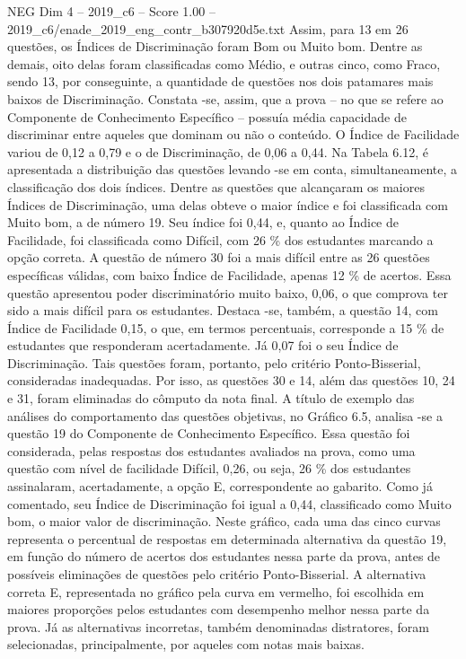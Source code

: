 \begin{textsample}{NEG Dim 4 – 2019\_c6 – Score 1.00 – 2019\_c6/enade\_2019\_eng\_contr\_b307920d5e.txt}
Assim, para 13 em 26 questões, os Índices de Discriminação foram Bom ou Muito bom.
Dentre as demais, oito delas foram classificadas como Médio, e outras cinco, como Fraco, sendo 13, por conseguinte, a quantidade de questões nos dois patamares mais baixos de Discriminação.
Constata -se, assim, que a prova – no que se refere ao Componente de Conhecimento Específico – possuía média capacidade de discriminar entre aqueles que dominam ou não o conteúdo.
O Índice de Facilidade variou de 0,12 a 0,79 e o de Discriminação, de 0,06 a 0,44.
Na Tabela 6.12, é apresentada a distribuição das questões levando -se em conta, simultaneamente, a classificação dos dois índices.
Dentre as questões que alcançaram os maiores Índices de Discriminação, uma delas obteve o maior índice e foi classificada com Muito bom, a de número 19.
Seu índice foi 0,44, e, quanto ao Índice de Facilidade, foi classificada como Difícil, com 26 \% dos estudantes marcando a opção correta.
A questão de número 30 foi a mais difícil entre as 26 questões específicas válidas, com baixo Índice de Facilidade, apenas 12 \% de acertos.
Essa questão apresentou poder discriminatório muito baixo, 0,06, o que comprova ter sido a mais difícil para os estudantes.
Destaca -se, também, a questão 14, com Índice de Facilidade 0,15, o que, em termos percentuais, corresponde a 15 \% de estudantes que responderam acertadamente.
Já 0,07 foi o seu Índice de Discriminação.
Tais questões foram, portanto, pelo critério Ponto-Bisserial, consideradas inadequadas.
Por isso, as questões 30 e 14, além das questões 10, 24 e 31, foram eliminadas do cômputo da nota final.
A título de exemplo das análises do comportamento das questões objetivas, no Gráfico 6.5, analisa -se a questão 19 do Componente de Conhecimento Específico.
Essa questão foi considerada, pelas respostas dos estudantes avaliados na prova, como uma questão com nível de facilidade Difícil, 0,26, ou seja, 26 \% dos estudantes assinalaram, acertadamente, a opção E, correspondente ao gabarito.
Como já comentado, seu Índice de Discriminação foi igual a 0,44, classificado como Muito bom, o maior valor de discriminação.
Neste gráfico, cada uma das cinco curvas representa o percentual de respostas em determinada alternativa da questão 19, em função do número de acertos dos estudantes nessa parte da prova, antes de possíveis eliminações de questões pelo critério Ponto-Bisserial.
A alternativa correta E, representada no gráfico pela curva em vermelho, foi escolhida em maiores proporções pelos estudantes com desempenho melhor nessa parte da prova.
Já as alternativas incorretas, também denominadas distratores, foram selecionadas, principalmente, por aqueles com notas mais baixas.

\end{textsample}
